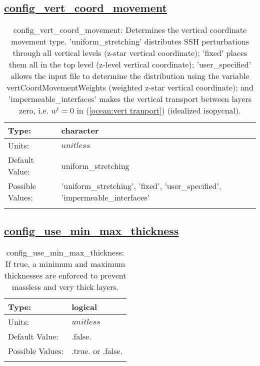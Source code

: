 \subsection[config\_vert\_coord\_movement]{\hyperref[sec:nm_tab_ALE_vertical_grid]{config\_vert\_coord\_movement}}
\label{subsec:nm_sec_config_vert_coord_movement}
\begin{center}
\begin{longtable}{| p{2.0in} | p{4.0in} |}
    \hline
    Type: & character \\
    \hline
    Units: & $unitless$ \\
    \hline
    Default Value: & uniform\_stretching \\
    \hline
    Possible Values: & 'uniform\_stretching', 'fixed', 'user\_specified', 'impermeable\_interfaces' \\
    \hline
    \caption{config\_vert\_coord\_movement:  Determines the vertical coordinate movement type. 'uniform\_stretching' distributes SSH perturbations through all vertical levels (z-star vertical coordinate); 'fixed' places them all in the top level (z-level vertical coordinate); 'user\_specified' allows the input file to determine the distribution using the variable vertCoordMovementWeights (weighted z-star vertical coordinate); and 'impermeable\_interfaces' makes the vertical transport between layers zero, i.e.  $w^t=0$  in (\ref{ocean:vert tranport}) (idealized isopycnal).}
\end{longtable}
\end{center}
\subsection[config\_use\_min\_max\_thickness]{\hyperref[sec:nm_tab_ALE_vertical_grid]{config\_use\_min\_max\_thickness}}
\label{subsec:nm_sec_config_use_min_max_thickness}
\begin{center}
\begin{longtable}{| p{2.0in} | p{4.0in} |}
    \hline
    Type: & logical \\
    \hline
    Units: & $unitless$ \\
    \hline
    Default Value: & .false. \\
    \hline
    Possible Values: & .true. or .false. \\
    \hline
    \caption{config\_use\_min\_max\_thickness: If true, a minimum and maximum thicknesses are enforced to prevent massless and very thick layers.}
\end{longtable}
\end{center}
